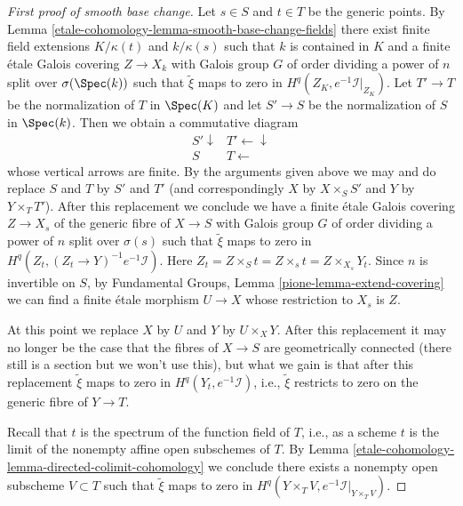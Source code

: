 \begin{proof}[First proof of smooth base change]
\medskip\noindent
Let $s \in S$ and $t \in T$ be the generic points. By
Lemma \ref{etale-cohomology-lemma-smooth-base-change-fields} there exist finite field
extensions $K/\kappa(t)$ and $k/\kappa(s)$ such that $k$ is contained in $K$
and a finite \'etale Galois covering $Z \to X_k$ with Galois group $G$
of order dividing a power of $n$ split over $\sigma(\Spec(k))$
such that $\tilde \xi$ maps to zero in $H^q(Z_K, e^{-1}\mathcal{I}|_{Z_K})$.
Let $T' \to T$ be the normalization of $T$ in $\Spec(K)$
and let $S' \to S$ be the normalization of $S$ in $\Spec(k)$.
Then we obtain a commutative diagram
$$
\begin{array}{cc}S' \downarrow & T' \longleftarrow\downarrow \\ S & T \longleftarrow\end{array}
$$
whose vertical arrows are finite. By the arguments given above we
may and do replace $S$ and $T$ by $S'$ and $T'$ (and correspondingly
$X$ by $X \times_S S'$ and $Y$ by $Y \times_T T'$). After this replacement
we conclude we have a finite \'etale Galois covering
$Z \to X_s$ of the generic fibre of $X \to S$
with Galois group $G$ of order dividing a power of $n$
split over $\sigma(s)$ such that $\tilde \xi$ maps to zero in
$H^q(Z_t, (Z_t \to Y)^{-1}e^{-1}\mathcal{I})$.
Here $Z_t = Z \times_S t = Z \times_s t = Z \times_{X_s} Y_t$.
Since $n$ is invertible on $S$,
by Fundamental Groups, Lemma \ref{pione-lemma-extend-covering}
we can find a finite \'etale morphism $U \to X$ whose restriction to $X_s$
is $Z$.

\medskip\noindent
At this point we replace $X$ by $U$ and $Y$ by $U \times_X Y$.
After this replacement it may
no longer be the case that the fibres of $X \to S$ are geometrically
connected (there still is a section but we won't use this), but what
we gain is that after this replacement $\tilde \xi$ maps to zero
in $H^q(Y_t, e^{-1}\mathcal{I})$, i.e., $\tilde \xi$ restricts to
zero on the generic fibre of $Y \to T$.

\medskip\noindent
Recall that $t$ is the spectrum of the function field of $T$, i.e.,
as a scheme $t$ is the limit of the nonempty affine open subschemes of $T$.
By Lemma \ref{etale-cohomology-lemma-directed-colimit-cohomology} we conclude there exists
a nonempty open subscheme $V \subset T$ such that $\tilde \xi$ maps to zero in
$H^q(Y \times_T V, e^{-1}\mathcal{I}|_{Y \times_T V})$.


\end{proof}
